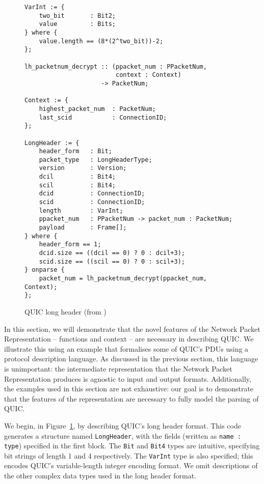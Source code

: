 \documentclass[10pt,sigconf]{acmart}
\begin{document}
\begin{figure}
	\vspace{3mm}
    \begin{BVerbatim}[fontsize=\scriptsize]
VarInt := {
	two_bit       : Bit2;
	value         : Bits;
} where {
	value.length == (8*(2^two_bit))-2;
};

lh_packetnum_decrypt :: (ppacket_num : PPacketNum, 
                         context : Context) 
                     -> PacketNum;
                     
Context := {
	highest_packet_num  : PacketNum;
	last_scid           : ConnectionID;
};

LongHeader := {
	header_form   : Bit;
	packet_type   : LongHeaderType;
	version       : Version;
	dcil          : Bit4;
	scil          : Bit4;
	dcid          : ConnectionID;
	scid          : ConnectionID;
	length        : VarInt;
	ppacket_num   : PPacketNum -> packet_num : PacketNum;
	payload       : Frame[];
} where {
	header_form == 1;
	dcid.size == ((dcil == 0) ? 0 : dcil+3);
	scid.size == ((scil == 0) ? 0 : scil+3);
} onparse {
	packet_num = lh_packetnum_decrypt(ppacket_num, Context);
};
    \end{BVerbatim}
    \caption{QUIC long header (from \cite{draft-ietf-quic-transport-latest})}
    \label{fig:quic-long-hdr-desc}
\end{figure}

In this section, we will demonstrate that the novel features of the Network Packet Representation
-- functions and context -- are necessary in describing QUIC. We illustrate this
using an example that formalises some of QUIC's PDUs using a protocol description
language. As discussed in the previous section, this language is unimportant: the
intermediate representation that the Network Packet Representation produces is agnostic to
input and output formats. Additionally, the examples used in this section are not
exhaustive: our goal is to demonstrate that the features of the representation are necessary to
fully model the parsing of QUIC.

We begin, in Figure~\ref{fig:quic-long-hdr-desc}, by describing QUIC's long header
format. This code generates a structure named \texttt{LongHeader}, with the fields
(written as \texttt{name : type}) specified in the first block. The \texttt{Bit} and 
\texttt{Bit4} types are intuitive, specifying bit strings of length 1 and 4 respectively.
The \texttt{VarInt} type is also specified; this encodes QUIC's variable-length integer
encoding format. We omit descriptions of the other complex data types used in the
long header format.
\end{document}
